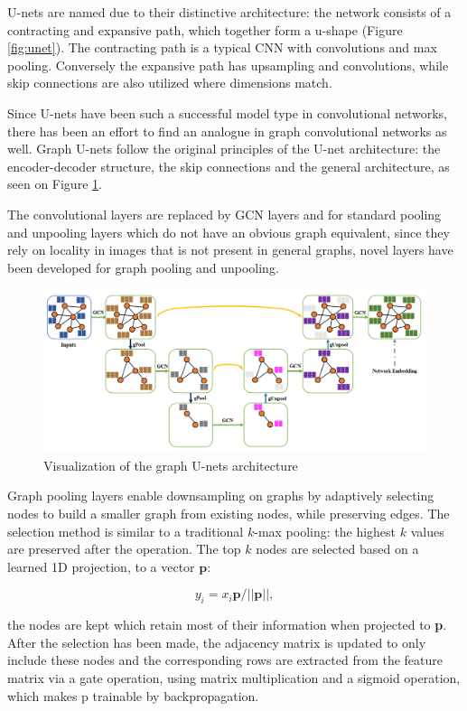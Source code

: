 	
	U-nets are named due to their distinctive architecture: the network consists of a contracting and expansive path, which together form a u-shape (Figure \ref{fig:unet}). The contracting path is a typical CNN with convolutions and max pooling. Conversely the expansive path has upsampling and convolutions, while skip connections are also utilized where dimensions match.
	
	Since U-nets have been such a successful model type in convolutional networks, there has been an effort to find an analogue in graph convolutional networks as well. Graph U-nets\cite{graph-u-net} follow the original principles of the U-net architecture: the encoder-decoder structure, the skip connections and the general architecture, as seen on Figure \ref{fig:gunet}. 
	
	The convolutional layers are replaced by GCN layers and for standard pooling and unpooling layers which do not have an obvious graph equivalent, since they rely on locality in images that is not present in general graphs, novel layers have been developed for graph pooling and unpooling.
	
	\begin{figure}[!h]
		\label{fig:gunet}
		\centering
		\includegraphics[width=\textwidth]{figures/gunet.png}
		\caption{Visualization of the graph U-nets architecture\cite{graph-u-net}}
	\end{figure}
	
	Graph pooling layers enable downsampling on graphs by adaptively selecting nodes to build a smaller graph from existing nodes, while preserving edges. The selection method is similar to a traditional $k$-max pooling: the highest $k$ values are preserved after the operation. The top $k$ nodes are selected based on a learned 1D projection, to a vector $\textbf{p}$:
	
	
	$$ y_i = x_i\textbf{p}/||\textbf{p}||, $$
	
	the nodes are kept which retain most of their information when projected to \textbf{p}. After the selection has been made, the adjacency matrix is updated to only include these nodes and the corresponding rows are extracted from the feature matrix via a gate operation, using matrix multiplication and a sigmoid operation, which makes p trainable by backpropagation.
	
